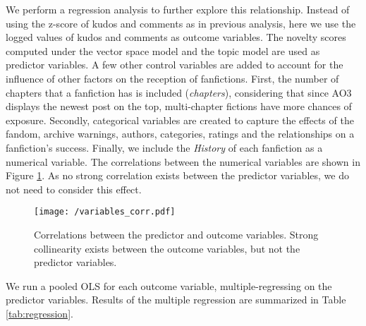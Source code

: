 \documentclass[a4paper]{article}
\begin{document}
We perform a regression analysis to further explore this relationship. Instead of using the z-score of kudos and comments as in previous analysis, here we use the logged values of kudos and comments as outcome variables. The novelty scores computed under the vector space model and the topic model are used as predictor variables. A few other control variables are added to account for the influence of other factors on the reception of fanfictions. First, the number of chapters that a fanfiction has is included (\emph{chapters}), considering that since AO3 displays the newest post on the top, multi-chapter fictions have more chances of exposure. Secondly, categorical variables are created to capture the effects of the fandom, archive warnings, authors, categories, ratings and the relationships on a fanfiction's success. Finally, we include the \emph{History} of each fanfiction as a numerical variable. The correlations between the numerical variables are shown in Figure \ref{fig:corr}. As no strong correlation exists between the predictor variables, we do not need to consider this effect.

\begin{figure}
    \centering
          \texttt{[image: /variables\_corr.pdf]}
        \caption{Correlations between the predictor and outcome variables. Strong collinearity exists between the outcome variables, but not the predictor variables. }
        \label{fig:corr}
\end{figure}

We run a pooled OLS for each outcome variable, multiple-regressing on the predictor variables. Results of the multiple regression are summarized in Table \ref{tab:regression}.
\end{document}
